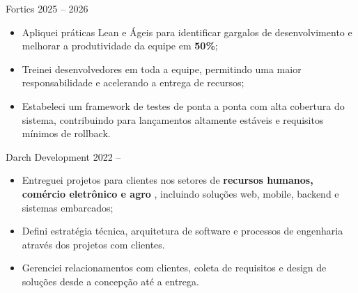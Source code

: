 

\cvitem%
{}
{}
{Fortics}
{2025 -- 2026}

\begin{itemize}[leftmargin=1em, itemsep=-0.1em, topsep=-0.1em]
  \item {}
        {Apliquei práticas Lean e Ágeis para identificar gargalos de desenvolvimento e melhorar a produtividade da equipe em \textbf{50\%};}
  \item {}
        {Treinei desenvolvedores em toda a equipe, permitindo uma maior responsabilidade e acelerando a entrega de recursos;}
  \item {}
        {Estabeleci um framework de testes de ponta a ponta com alta cobertura do sistema, contribuindo para lançamentos altamente estáveis e requisitos mínimos de rollback.}
\end{itemize}
\vspace{0.5em}

\cvitem%
{}
{}
{Darch Development}
{2022 -- }
\begin{itemize}[leftmargin=1em, itemsep=-0.1em, topsep=-0.1em]
  \item {}
        {Entreguei projetos para clientes nos setores de \textbf{recursos humanos, comércio eletrônico e agro} , incluindo soluções web, mobile, backend e sistemas embarcados;}
  \item {}
        {Defini estratégia técnica, arquitetura de software e processos de engenharia através dos projetos com clientes.}
  \item {}
        {Gerenciei relacionamentos com clientes, coleta de requisitos e design de soluções desde a concepção até a entrega.}
\end{itemize}
